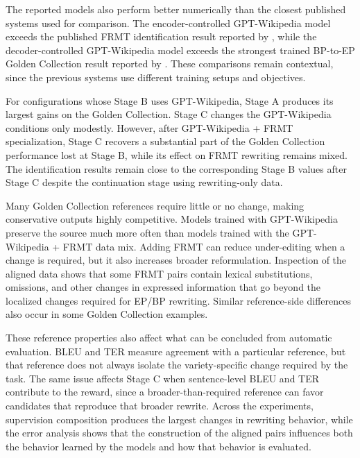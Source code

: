 {
The reported models also perform better numerically than the closest published
systems used for comparison. The encoder-controlled GPT-Wikipedia model exceeds
the published FRMT identification result reported by
\cite{sousa2025enhancingportuguesevarietyidentification}, while the
decoder-controlled GPT-Wikipedia model exceeds the strongest trained BP-to-EP
Golden Collection result reported by
\cite{sanches2024brazilianportugueseeuropeanportuguese}. These comparisons remain
contextual, since the previous systems use different training setups and
objectives.\par}

{
For configurations whose Stage B uses GPT-Wikipedia, Stage A produces its
largest gains on the Golden Collection. Stage C changes
the GPT-Wikipedia conditions only modestly. However, after GPT-Wikipedia + FRMT
specialization, Stage C recovers a substantial part of the Golden Collection
performance lost at Stage B, while its effect on FRMT rewriting remains mixed.
The identification results remain close to the corresponding Stage B values
after Stage C despite the continuation stage using rewriting-only data.\par}

{
Many Golden Collection references require little or no change, making
conservative outputs highly competitive. Models trained with GPT-Wikipedia
preserve the source much more often than models trained with the GPT-Wikipedia +
FRMT data mix. Adding FRMT can reduce under-editing when a change is required,
but it also increases broader reformulation. Inspection of the aligned data
shows that some FRMT pairs contain lexical substitutions, omissions, and other
changes in expressed information that go beyond the localized changes required
for EP/BP rewriting. Similar reference-side differences also occur in some
Golden Collection examples.\par}

{
These reference properties also affect what can be concluded from automatic
evaluation. BLEU and TER measure agreement with a particular reference, but
that reference does not always isolate the variety-specific change required by
the task. The same issue affects Stage C when sentence-level BLEU and TER
contribute to the reward, since a broader-than-required reference can favor
candidates that reproduce that broader rewrite. Across the experiments,
supervision composition produces the largest changes in rewriting behavior,
while the error analysis shows that the construction of the aligned pairs
influences both the behavior learned by the models and how that behavior is
evaluated.\par}

